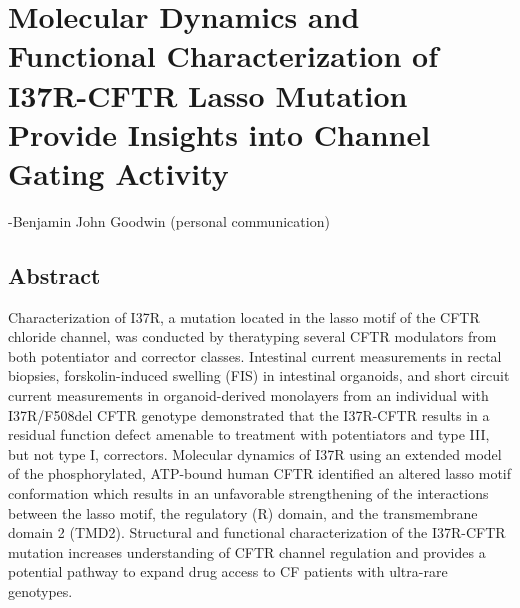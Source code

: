 \chapter{Molecular Dynamics and Functional Characterization of I37R-CFTR Lasso Mutation Provide Insights into Channel Gating Activity}
\label{chap:I37R}
 {-Benjamin John Goodwin (personal communication)}

\section*{\centering Abstract} 

Characterization of I37R, a mutation located in the lasso motif of the CFTR chloride channel, was conducted by theratyping several CFTR modulators from both potentiator and corrector classes. Intestinal current measurements in rectal biopsies, forskolin-induced swelling (FIS) in intestinal organoids, and short circuit current measurements in organoid-derived monolayers from an individual with I37R/F508del CFTR genotype demonstrated that the I37R-CFTR results in a residual function defect amenable to treatment with potentiators and type III, but not type I, correctors. Molecular dynamics of I37R using an extended model of the phosphorylated, ATP-bound human CFTR identified an altered lasso motif conformation which results in an unfavorable strengthening of the interactions between the lasso motif, the regulatory (R) domain, and the transmembrane domain 2 (TMD2). Structural and functional characterization of the I37R-CFTR mutation increases understanding of CFTR channel regulation and provides a potential pathway to expand drug access to CF patients with ultra-rare genotypes.\\

\smallskip

